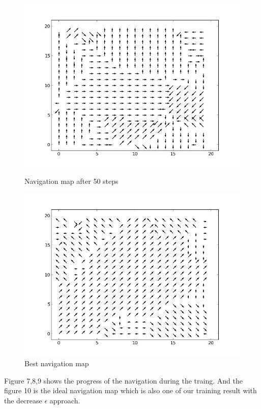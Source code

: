 \documentclass[a4paper, 12pt]{article}
\begin{document}
\begin{figure}
\begin{minipage}[c]{0.5\textwidth}
    \includegraphics[scale=0.3]{../figure/navMp50.jpeg}
  \caption{Navigation map after 50 steps}
  \end{minipage}%
  \begin{minipage}[c]{0.5\textwidth}
    \centering
    \includegraphics[scale=0.3]{../figure/navMap.jpeg}
  \caption{Best navigation map}
  \end{minipage}
\end{figure}

Figure 7,8,9 shows the progress of the navigation during the traing. And the figure 10 is the ideal navigation map which is also one of our training result with the decrease $\epsilon$ approach.
\end{document}
